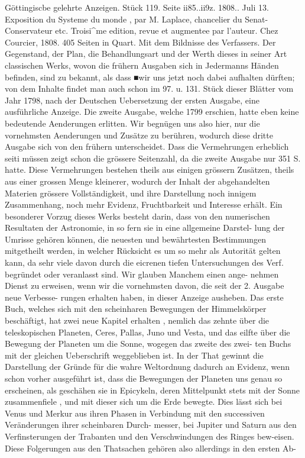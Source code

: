 \documentclass[12pt,a4paper]{article}
\begin{document}
Göttingiscbe  gelehrte  Anzeigen.     Stück  119.     Seite  ii85..ii9z.     1808..  Juli  13. Exposition  du  Systeme  du  monde ,  par  M.  Laplace,  chancelier  du  Senat- Conservateur  etc.  Troisi\textasciicircum{}me edition,  revue  et  augmentee  par  l'auteur.  Chez  Courcier,  1808.  405  Seiten  in  Quart.  Mit  dem  Bildnisse des  Verfassers. Der  Gegenstand,  der  Plan,  die  Behandlungsart  und  der  Werth  dieses  in  seiner  Art  classischen Werks,  wovon  die  frühern  Ausgaben  sich  in  Jedermanns  Händen  befinden,  sind  zu  bekannt,  als  dass ■wir  uns  jetzt  noch  dabei  aufhalten  dürften;  von  dem  Inhalte  findet  man  auch  schon  im  97.  u.  131.  Stück dieser  Blätter  vom  Jahr  1798,  nach  der  Deutschen  Uebersetzung  der  ersten  Ausgabe,  eine  ausführliche Anzeige.  Die  zweite  Ausgabe,  welche  1799  erschien,  hatte  eben  keine  bedeutende  Aenderungen  erlitten. Wir  begnügen  uns  also  hier,  nur  die  vornehmsten  Aenderungen  und  Zusätze  zu  berühren,  wodurch  diese dritte  Ausgabe  sich  von  den  frühern  unterscheidet.  Dass  die  Vermehrungen  erheblich  seiti  müssen  zeigt schon  die  grössere  Seitenzahl,  da  die  zweite  Ausgabe  nur  351  S.  hatte.  Diese  Vermehrungen  bestehen theils  aus  einigen  grössern  Zusätzen,  theils  aus  einer  grossen  Menge  kleinerer,  wodurch  der  Inhalt  der abgehandelten  Materien  grössere  Vollständigkeit,  und  ihre  Darstellung  noch  innigem  Zusammenhang, noch  mehr  Evidenz,  Fruchtbarkeit  und  Interesse  erhält.  Ein  besonderer  Vorzug  dieses  Werks  besteht darin,  dass  von  den  numerischen  Resultaten  der  Astronomie,  in  so  fern  sie  in  eine  allgemeine  Darstel- lung der  Umrisse  gehören  können,  die  neuesten  und  bewährtesten  Bestimmungen  mitgetheilt  werden, in  welcher  Rücksicht  es  um  so  mehr  als  Autorität  gelten  kann,  da  sehr  viele  davon  durch  die  eicrenen tiefen  Untersuchungen  des  Verf.  begründet  oder  veranlasst  sind.  Wir  glauben  Manchem  einen  ange- nehmen Dienst  zu  erweisen,  wenn  wir  die  vornehmsten  davon,  die  seit  der  2.  Ausgabe  neue  Verbesse- rungen erhalten  haben,  in  dieser  Anzeige  ausheben. Das  erste  Buch,  welches  sich  mit  den  scheinharen  Bewegungen  der  Himmelskörper  beschäftigt, hat  zwei  neue  Kapitel  erhalten ,  nemlich  das  zehnte  über  die  teleskopischen  Planeten,  Ceres,  Pallas,  Juno und  Vesta,  und  das  eilfte  über  die  Bewegung  der  Planeten  um  die  Sonne,  wogegen  das  zweite  des  zwei- ten Buchs  mit  der  gleichen  Ueberschrift  weggeblieben  ist.  In  der  That  gewinnt  die  Darstellung  der Gründe  für  die  wahre  Weltordnung  dadurch  an  Evidenz,  wenn  schon  vorher  ausgeführt  ist,  dass  die Bewegungen  der  Planeten  uns  genau  so  erscheinen,  als  geschähen  sie  in  Epicykeln,  deren  Mittelpunkt stets  mit  der  Sonne  zusammenfiele ,  und  mit  dieser  sich  um  die  Erde  bewegte.  Dies  lässt  sich  bei  Venus und  Merkur  aus  ihren  Phasen  in  Verbindung  mit  den  successiven  Veränderungen  ihrer  scheinbaren  Durch- messer, bei  Jupiter  und  Saturn  aus  den  Verfinsterungen  der  Trabanten  und  den  Verschwindungen  des Ringes  bew-eisen.  Diese  Folgerungen  aus  den  Thatsachen  gehören  also  allerdings  in  den  ersten  Ab- 
\end{document}
